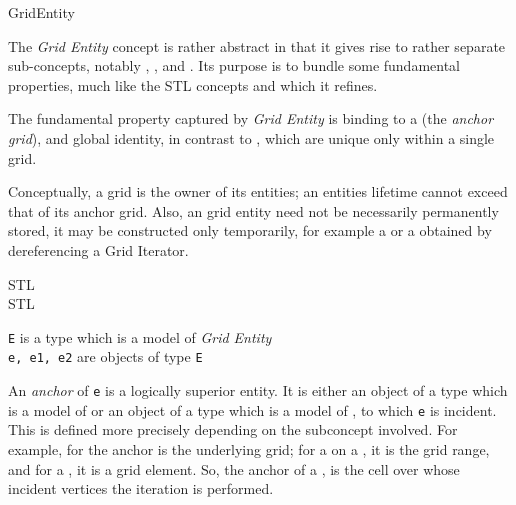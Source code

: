 \begin{Label}{GridEntity}
\end{Label}

The {\em Grid Entity\/} concept is rather abstract in that it gives rise to rather
separate sub-concepts, notably ,
,
and .
Its purpose is to bundle some fundamental properties, much like the STL concepts
 and 
which it refines.

The fundamental property captured by {\em Grid Entity\/} is binding to a 
(the {\em anchor grid\/}), 
and global identity, 
in contrast to ,
which are unique only within a single grid.

Conceptually, a grid is the owner of its entities; 
an entities lifetime cannot exceed that of
its anchor grid. 
Also, an grid entity need  not be necessarily permanently stored,
it may be constructed only temporarily, 
for example a
or a  
obtained by dereferencing a  Grid Iterator.

STL 
\\
STL 


{\tt E} is a type which is a model of {\em Grid Entity\/}
\\
{\tt e, e1, e2} are objects of type {\tt E}


      \label{anchor}
      An {\em anchor\/} of {\tt e} is a logically superior entity.
      It is either an object of a type which is a model of 
      or an object of a type which is a model of 
      ,
      to which {\tt e} is incident. 
      This is defined more precisely depending on the
      subconcept involved. For example, for
      the anchor is the underlying grid;
      for a 
      on a 
      ,
      it is the grid range, 
      and for a
      ,
      it is a grid element.
      So, the anchor of a 
      ,
      is the cell over whose incident vertices the iteration is performed.
 
